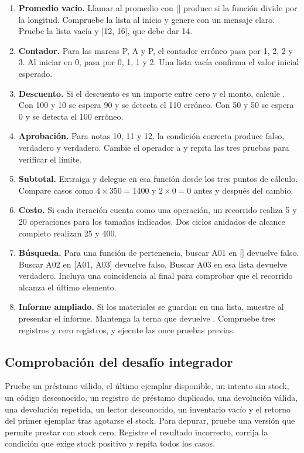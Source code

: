 \begin{enumerate}
\item \textbf{Promedio vacío.} Llamar al promedio con [] produce  si la función divide por la longitud. Compruebe la lista al inicio y genere  con un mensaje claro. Pruebe la lista vacía y [12, 16], que debe dar 14.
\item \textbf{Contador.} Para las marcas P, A y P, el contador erróneo pasa por 1, 2, 2 y 3. Al iniciar en 0, pasa por 0, 1, 1 y 2. Una lista vacía confirma el valor inicial esperado.
\item \textbf{Descuento.} Si el descuento es un importe entre cero y el monto, calcule . Con 100 y 10 se espera 90 y se detecta el 110 erróneo. Con 50 y 50 se espera 0 y se detecta el 100 erróneo.
\item \textbf{Aprobación.} Para notas 10, 11 y 12, la condición correcta produce falso, verdadero y verdadero. Cambie el operador a \Codigo{>=} y repita las tres pruebas para verificar el límite.
\item \textbf{Subtotal.} Extraiga  y delegue en esa función desde los tres puntos de cálculo. Compare casos como \(4\times350=1400\) y \(2\times0=0\) antes y después del cambio.
\item \textbf{Costo.} Si cada iteración cuenta como una operación, un recorrido realiza 5 y 20 operaciones para los tamaños indicados. Dos ciclos anidados de alcance completo realizan 25 y 400.
\item \textbf{Búsqueda.} Para una función de pertenencia, buscar A01 en [] devuelve falso. Buscar A02 en [A01, A03] devuelve falso. Buscar A03 en esa lista devuelve verdadero. Incluya una coincidencia al final para comprobar que el recorrido alcanza el último elemento.
\item \textbf{Informe ampliado.} Si los materiales se guardan en una lista, muestre  al presentar el informe. Mantenga la terna que devuelve . Compruebe tres registros y cero registros, y ejecute las once pruebas previas.
\end{enumerate}

\subsection{Comprobación del desafío integrador}

Pruebe un préstamo válido, el último ejemplar disponible, un intento sin stock, un código desconocido, un registro de préstamo duplicado, una devolución válida, una devolución repetida, un lector desconocido, un inventario vacío y el retorno del primer ejemplar tras agotarse el stock. Para depurar, pruebe una versión que permite prestar con stock cero. Registre el resultado incorrecto, corrija la condición que exige stock positivo y repita todos los casos.
